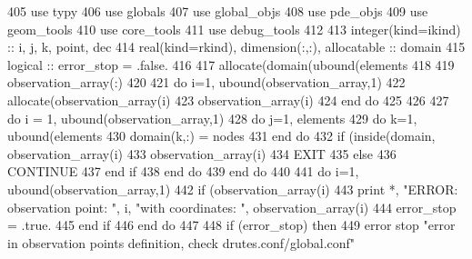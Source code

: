 \begin{DoxyCode}
405       \textcolor{keywordtype}{use }typy
406       \textcolor{keywordtype}{use }globals
407       \textcolor{keywordtype}{use }global_objs
408       \textcolor{keywordtype}{use }pde_objs
409       \textcolor{keywordtype}{use }geom_tools
410       \textcolor{keywordtype}{use }core_tools
411       \textcolor{keywordtype}{use }debug_tools
412 
413       \textcolor{keywordtype}{integer(kind=ikind)} :: i, j, k, point, dec
414       \textcolor{keywordtype}{real(kind=rkind)}, \textcolor{keywordtype}{dimension(:,:)}, \textcolor{keywordtype}{allocatable} :: domain
415       \textcolor{keywordtype}{logical} :: error\_stop = .false.
416 
417       \textcolor{keyword}{allocate}(domain(ubound(elements%
418 
419       observation_array(:)%
420       
421       \textcolor{keywordflow}{do} i=1, ubound(observation_array,1)
422         \textcolor{keyword}{allocate}(observation_array(i)%
423         observation_array(i)%
424 \textcolor{keywordflow}{      end do}
425       
426 
427       \textcolor{keywordflow}{do} i = 1, ubound(observation_array,1)
428         \textcolor{keywordflow}{do} j=1, elements%
429           \textcolor{keywordflow}{do} k=1, ubound(elements%
430             domain(k,:) = nodes%
431 \textcolor{keywordflow}{          end do}
432           \textcolor{keywordflow}{if} (inside(domain, observation_array(i)%
433             observation_array(i)%
434             \textcolor{keywordflow}{EXIT}
435           \textcolor{keywordflow}{else}
436             \textcolor{keywordflow}{CONTINUE}
437 \textcolor{keywordflow}{          end if}
438 \textcolor{keywordflow}{        end do}
439 \textcolor{keywordflow}{      end do}
440 
441       \textcolor{keywordflow}{do} i=1, ubound(observation_array,1)
442         \textcolor{keywordflow}{if} (observation_array(i)%
443           print *, \textcolor{stringliteral}{"ERROR: observation point: "}, i, \textcolor{stringliteral}{"with coordinates: "}, 
      observation_array\textcolor{comment}{(i)%
444           error\_stop = .true.
445 \textcolor{keywordflow}{        end if}
446 \textcolor{keywordflow}{      end do}
447 
448       \textcolor{keywordflow}{if} (error\_stop) \textcolor{keywordflow}{then}
449         error stop \textcolor{stringliteral}{"error in observation points definition, check drutes.conf/global.conf"}
}
\end{DoxyCode}
